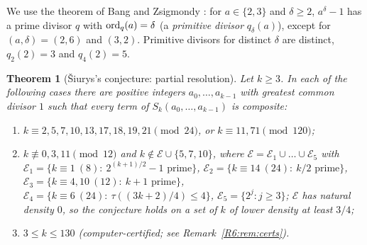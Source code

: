 \documentclass[11pt]{amsart}
\newtheorem{theorem}{Theorem}[section]
\theoremstyle{definition}
\theoremstyle{remark}
\begin{document}
We use the theorem of Bang and Zsigmondy \cite{R6-Zsigmondy}: for $a\in\{2,3\}$ and $\delta\ge2$,
$a^\delta-1$ has a prime divisor $q$ with $\operatorname{ord}_q(a)=\delta$ (a \emph{primitive divisor}
$q_\delta(a)$), except for $(a,\delta)=(2,6)$ and $(3,2)$. Primitive divisors for distinct $\delta$ are
distinct, $q_2(2)=3$ and $q_4(2)=5$.

\begin{theorem}[\v{S}iurys's conjecture: partial resolution]\label{R6:thm:siurys}
Let $k\ge3$. In each of the following cases there are positive integers $a_0,\dots,a_{k-1}$
with greatest common divisor $1$ such that \emph{every} term of $S_k(a_0,\dots,a_{k-1})$ is
composite:
\begin{enumerate}
\item[(a)] $k\equiv 2,5,7,10,13,17,18,19,21\pmod{24}$, or $k\equiv 11,71\pmod{120}$;
\item[(b)] $k\not\equiv0,3,11\pmod{12}$ and $k\notin\mathcal E\cup\{5,7,10\}$, where
$\mathcal E=\mathcal E_1\cup\dots\cup\mathcal E_5$ with
$\mathcal E_1=\{k\equiv1\ (8):\ 2^{(k+1)/2}-1\text{ prime}\}$,
$\mathcal E_2=\{k\equiv14\ (24):\ k/2\text{ prime}\}$,
$\mathcal E_3=\{k\equiv4,10\ (12):\ k+1\text{ prime}\}$,
$\mathcal E_4=\{k\equiv6\ (24):\ \tau((3k+2)/4)\le4\}$,
$\mathcal E_5=\{2^j:j\ge3\}$; $\mathcal E$ has natural density $0$, so the conjecture holds on a set
of $k$ of lower density at least $3/4$;
\item[(c)] $3\le k\le 130$ (computer-certified; see Remark~\ref{R6:rem:certs}).
\end{enumerate}
\end{theorem}
\end{document}
